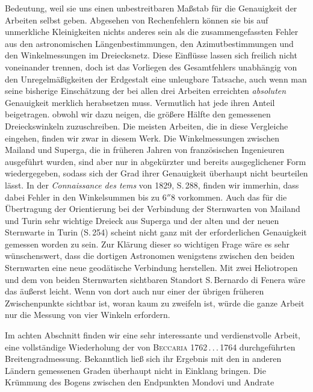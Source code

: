 %
Bedeutung, weil sie uns einen unbestreitbaren Maßstab für die Genauigkeit der Arbeiten selbst geben. Abgesehen von Rechenfehlern können sie bis auf unmerkliche Kleinigkeiten nichts anderes sein als die zusammengefassten Fehler aus den astronomischen Längenbestimmungen, den Azimutbestimmungen und den Winkelmessungen im Dreiecksnetz. Diese Einflüsse lassen sich freilich nicht voneinander trennen, doch ist das Vorliegen des Gesamtfehlers unabhängig von den Unregelmäßigkeiten der Erdgestalt eine unleugbare Tatsache, auch wenn man seine bisherige Einschätzung der bei allen drei Arbeiten erreichten \textit{absoluten} Genauigkeit merklich herabsetzen muss. Vermutlich hat jede ihren Anteil beigetragen. obwohl wir dazu neigen, die größere Hälfte den gemessenen Dreieckswinkeln zuzuschreiben. Die meisten Arbeiten, die in diese Vergleiche eingehen, finden wir zwar in diesem Werk. Die Winkelmessungen zwischen Mailand und Superga, die in früheren Jahren von französischen Ingenieuren ausgeführt wurden, sind aber nur in abgekürzter und bereits ausgeglichener Form wiedergegeben, sodass sich der Grad ihrer Genauigkeit überhaupt nicht beurteilen lässt. In der \textit{Connaissance des tems} von 1829, S.\,288, finden wir immerhin, dass dabei Fehler in den Winkelsummen bis zu \(6''8\) vorkommen. Auch das für die Übertragung der Orientierung bei der Verbindung der Sternwarten von Mailand und Turin sehr wichtige Dreieck aus Superga und der alten und der neuen Sternwarte in Turin (S.\,254) scheint nicht ganz mit der erforderlichen Genauigkeit gemessen worden zu sein. Zur Klärung dieser so wichtigen Frage wäre es sehr wünschenswert, dass die dortigen Astronomen wenigstens zwischen den beiden Sternwarten eine neue geodätische Verbindung herstellen. Mit zwei Heliotropen und dem von beiden Sternwarten sichtbaren Standort S.\,Bernardo di Fenera wäre das äußerst leicht. Wenn von dort auch nur einer der übrigen früheren Zwischenpunkte sichtbar ist, woran kaum zu zweifeln ist, würde die ganze Arbeit nur die Messung von vier Winkeln erfordern.

Im achten Abschnitt finden wir eine sehr interessante und verdienstvolle Arbeit, eine vollständige Wiederholung der von \textsc{Beccaria} 1762\,.\,.\,.\,1764 durchgeführten Breitengradmessung. Bekanntlich ließ sich ihr Ergebnis mit den in anderen Ländern gemessenen Graden überhaupt nicht in Einklang bringen. Die Krümmung des Bogens zwischen den Endpunkten Mondovi und Andrate
